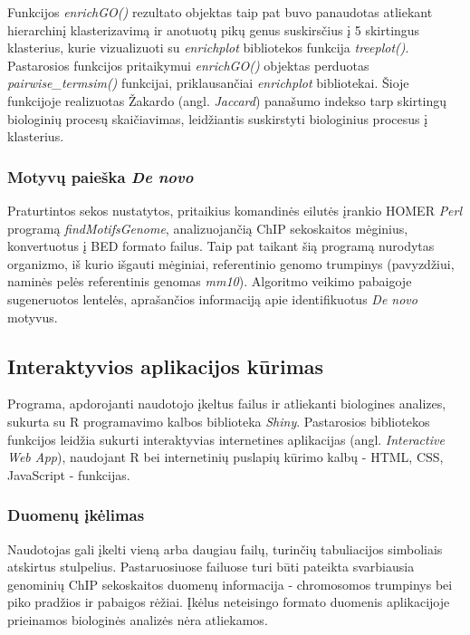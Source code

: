 \documentclass[12pt]{article}
\begin{document}
Funkcijos \emph{enrichGO()} rezultato objektas taip pat buvo panaudotas
atliekant hierarchinį klasterizavimą ir anotuotų pikų genus suskirsčius į
5 skirtingus klasterius, kurie vizualizuoti su \emph{enrichplot} bibliotekos
funkcija \emph{treeplot()}. Pastarosios funkcijos pritaikymui \emph{enrichGO()}
objektas perduotas \emph{pairwise\_termsim()} funkcijai, priklausančiai
\emph{enrichplot} bibliotekai. Šioje funkcijoje realizuotas Žakardo
(angl. \emph{Jaccard}) panašumo indekso tarp skirtingų biologinių procesų
skaičiavimas, leidžiantis suskirstyti biologinius procesus į klasterius.

\subsubsection*{Motyvų paieška \emph{De novo}}
Praturtintos sekos nustatytos, pritaikius komandinės eilutės įrankio
HOMER\cite{HOMER} \emph{Perl} programą \emph{findMotifsGenome}, analizuojančią
ChIP sekoskaitos mėginius, konvertuotus į BED formato failus. Taip pat taikant
šią programą nurodytas organizmo, iš kurio išgauti mėginiai, referentinio genomo
trumpinys (pavyzdžiui, naminės pelės referentinis genomas \emph{mm10}).
Algoritmo veikimo pabaigoje sugeneruotos lentelės, aprašančios informaciją
apie identifikuotus \emph{De novo} motyvus.

\newpage

\subsection{Interaktyvios aplikacijos kūrimas}
Programa, apdorojanti naudotojo įkeltus failus ir atliekanti biologines
analizes, sukurta su R programavimo kalbos biblioteka \emph{Shiny}\cite{SHINY}.
Pastarosios bibliotekos funkcijos leidžia sukurti interaktyvias internetines
aplikacijas (angl. \emph{Interactive Web App}), naudojant R bei internetinių
puslapių kūrimo kalbų - HTML, CSS, JavaScript - funkcijas.

\subsubsection*{Duomenų įkėlimas}
Naudotojas gali įkelti vieną arba daugiau failų, turinčių tabuliacijos
simboliais atskirtus stulpelius. Pastaruosiuose failuose turi būti pateikta
svarbiausia genominių ChIP sekoskaitos duomenų informacija - chromosomos
trumpinys bei piko pradžios ir pabaigos rėžiai. Įkėlus neteisingo formato
duomenis aplikacijoje prieinamos biologinės analizės nėra atliekamos.
\end{document}

